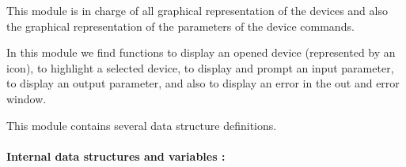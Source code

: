 %
%
%
%
%
%
%
%
%
%
This module is in charge of all graphical representation of the devices and
also the graphical representation of the parameters of the device commands.

In this module we find functions to display an opened device (represented by
an icon), to highlight a selected device, to display and prompt an input
parameter, to display an output parameter, and also to display an error in the 
out and error window.

This module contains several data structure definitions.

\paragraph{Internal data structures and variables : }

